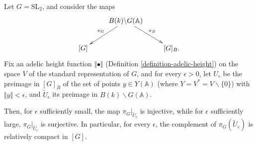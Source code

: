 \begin{theorem}
 \label{theorem-reduction-SL2}
Let $G = \text{SL}_2$, and consider the maps 
\begin{equation}
\label{equation-leftrightSL2} 
\xymatrix{
& B(k)\backslash G(\mathbb A) \ar[dl]_{\pi_G}\ar[dr]^{\pi_B}& \\
[G] && [G]_B. 
}\end{equation}
Fix an adelic height function $\Vert \bullet \Vert$ (Definition \ref{definition-adelic-height}) on the space $V$ of the standard representation of $G$, and for every $\epsilon >0$, let $U_\epsilon$ be the preimage in $[G]_B$ of the set of points $y\in Y(\mathbb A)$ (where $Y=V^*=V\smallsetminus\{0\}$) with $\Vert y \Vert <\epsilon$, and $\tilde U_\epsilon$ its preimage in $B(k)\backslash G(\mathbb A)$.

Then, for $\epsilon$ sufficiently small, the map $\pi_G|_{\tilde U_\epsilon}$ is injective, while for $\epsilon$ sufficiently large, $\pi_G|_{\tilde U_\epsilon}$ is surjective. In particular, for every $\epsilon$, the complement of $\pi_G({\tilde U_\epsilon})$ is relatively compact in $[G]$.
\end{theorem}

